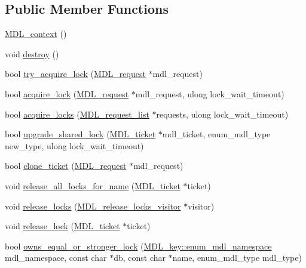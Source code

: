 \subsection*{Public Member Functions}
\begin{DoxyCompactItemize}
\item 
\mbox{\hyperlink{classMDL__context_a21b35ef90597dcd411bf091acd1f4a38}{M\+D\+L\+\_\+context}} ()
\item 
void \mbox{\hyperlink{classMDL__context_af01a1f42bd9ed050556c434fb6d007ac}{destroy}} ()
\item 
bool \mbox{\hyperlink{classMDL__context_ab6d07a861aaf9db6fda46da196a8b0d0}{try\+\_\+acquire\+\_\+lock}} (\mbox{\hyperlink{classMDL__request}{M\+D\+L\+\_\+request}} $\ast$mdl\+\_\+request)
\item 
bool \mbox{\hyperlink{classMDL__context_a3702152de7ebdf6e2c54e5ba5cbecfda}{acquire\+\_\+lock}} (\mbox{\hyperlink{classMDL__request}{M\+D\+L\+\_\+request}} $\ast$mdl\+\_\+request, ulong lock\+\_\+wait\+\_\+timeout)
\item 
bool \mbox{\hyperlink{classMDL__context_a4583e611d097158c5f08b8d1133fbd7e}{acquire\+\_\+locks}} (\mbox{\hyperlink{classI__P__List}{M\+D\+L\+\_\+request\+\_\+list}} $\ast$requests, ulong lock\+\_\+wait\+\_\+timeout)
\item 
bool \mbox{\hyperlink{classMDL__context_a2a7108b456e7c5ee715ee6511c03d542}{upgrade\+\_\+shared\+\_\+lock}} (\mbox{\hyperlink{classMDL__ticket}{M\+D\+L\+\_\+ticket}} $\ast$mdl\+\_\+ticket, enum\+\_\+mdl\+\_\+type new\+\_\+type, ulong lock\+\_\+wait\+\_\+timeout)
\item 
bool \mbox{\hyperlink{classMDL__context_a74ed5299b1da65397a7e6972425b5f2d}{clone\+\_\+ticket}} (\mbox{\hyperlink{classMDL__request}{M\+D\+L\+\_\+request}} $\ast$mdl\+\_\+request)
\item 
void \mbox{\hyperlink{classMDL__context_a73bd65389a74778433291eb2d426c71f}{release\+\_\+all\+\_\+locks\+\_\+for\+\_\+name}} (\mbox{\hyperlink{classMDL__ticket}{M\+D\+L\+\_\+ticket}} $\ast$ticket)
\item 
void \mbox{\hyperlink{classMDL__context_a71874a5e485217650429849ab29ed43b}{release\+\_\+locks}} (\mbox{\hyperlink{classMDL__release__locks__visitor}{M\+D\+L\+\_\+release\+\_\+locks\+\_\+visitor}} $\ast$visitor)
\item 
void \mbox{\hyperlink{classMDL__context_a58d0df5eb422cbfa9a4225218c76141f}{release\+\_\+lock}} (\mbox{\hyperlink{classMDL__ticket}{M\+D\+L\+\_\+ticket}} $\ast$ticket)
\item 
bool \mbox{\hyperlink{classMDL__context_adffac048f9ce71eb3a5e3b1a38178fdc}{owns\+\_\+equal\+\_\+or\+\_\+stronger\+\_\+lock}} (\mbox{\hyperlink{structMDL__key_a391ec4bd98fec6852a48f7856546ed3b}{M\+D\+L\+\_\+key\+::enum\+\_\+mdl\+\_\+namespace}} mdl\+\_\+namespace, const char $\ast$db, const char $\ast$name, enum\+\_\+mdl\+\_\+type mdl\+\_\+type)

\end{DoxyCompactItemize}
